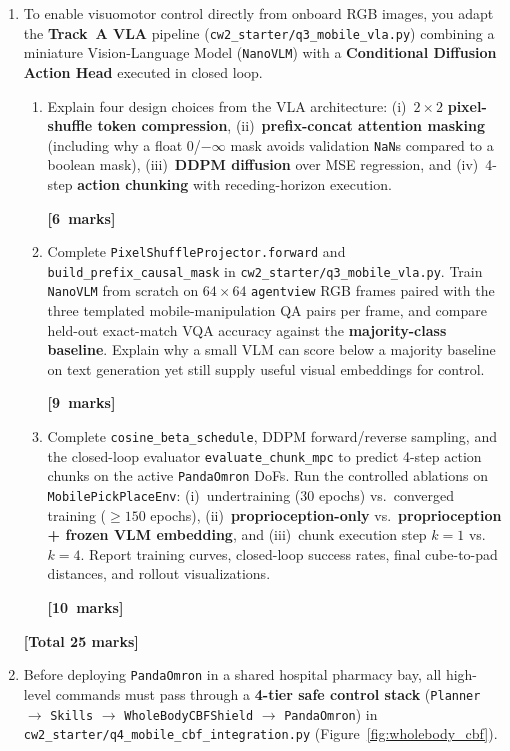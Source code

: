 \documentclass[11pt,a4paper]{article}
\newcommand{\qmarks}[1]{\par\nopagebreak\noindent\hfill\mbox{\textbf{[#1 marks]}}}
\newcommand{\qtotal}[1]{\par\smallskip\noindent\hfill\textbf{[Total #1 marks]}\par\medskip}
\begin{document}
\begin{enumerate}[label=\textbf{\arabic*.}, leftmargin=1.4em, itemsep=1.0em]
\item To enable visuomotor control directly from onboard RGB images, you adapt the \textbf{Track~A VLA} pipeline (\texttt{cw2\_starter/q3\_mobile\_vla.py}) combining a miniature Vision-Language Model (\texttt{NanoVLM}) with a \textbf{Conditional Diffusion Action Head} executed in closed loop.
\begin{enumerate}[label=\textbf{\alph*.}, leftmargin=1.6em, itemsep=0.45em]
    \item Explain four design choices from the VLA architecture: (i)~$2\times 2$ \textbf{pixel-shuffle token compression}, (ii)~\textbf{prefix-concat attention masking} (including why a float $0$/$-\infty$ mask avoids validation \texttt{NaN}s compared to a boolean mask), (iii)~\textbf{DDPM diffusion} over MSE regression, and (iv)~4-step \textbf{action chunking} with receding-horizon execution. \qmarks{6}

    \item Complete \texttt{PixelShuffleProjector.forward} and \texttt{build\_prefix\_causal\_mask} in \texttt{cw2\_starter/q3\_mobile\_vla.py}. Train \texttt{NanoVLM} from scratch on $64\times 64$ \texttt{agentview} RGB frames paired with the three templated mobile-manipulation QA pairs per frame, and compare held-out exact-match VQA accuracy against the \textbf{majority-class baseline}. Explain why a small VLM can score below a majority baseline on text generation yet still supply useful visual embeddings for control. \qmarks{9}

    \item Complete \texttt{cosine\_beta\_schedule}, DDPM forward/reverse sampling, and the closed-loop evaluator \texttt{evaluate\_chunk\_mpc} to predict 4-step action chunks on the active \texttt{PandaOmron} DoFs. Run the controlled ablations on \texttt{MobilePickPlaceEnv}: (i)~undertraining (30 epochs) vs.\ converged training ($\ge 150$ epochs), (ii)~\textbf{proprioception-only} vs.\ \textbf{proprioception + frozen VLM embedding}, and (iii)~chunk execution step $k = 1$ vs.\ $k = 4$. Report training curves, closed-loop success rates, final cube-to-pad distances, and rollout visualizations. \qmarks{10}
\end{enumerate}
\qtotal{25}

\item Before deploying \texttt{PandaOmron} in a shared hospital pharmacy bay, all high-level commands must pass through a \textbf{4-tier safe control stack} (\texttt{Planner} $\to$ \texttt{Skills} $\to$ \texttt{WholeBodyCBFShield} $\to$ \texttt{PandaOmron}) in \texttt{cw2\_starter/q4\_mobile\_cbf\_integration.py} (Figure~\ref{fig:wholebody_cbf}).


\end{enumerate}
\end{document}
